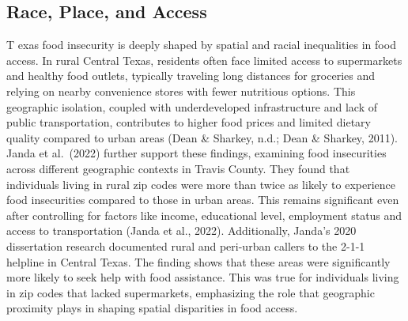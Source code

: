 \documentclass[
]{article}
\begin{document}
\subsection{Race, Place, and Access}\label{race-place-and-access}

T exas food insecurity is deeply shaped by spatial and racial
inequalities in food access. In rural Central Texas, residents often
face limited access to supermarkets and healthy food outlets, typically
traveling long distances for groceries and relying on nearby convenience
stores with fewer nutritious options. This geographic isolation, coupled
with underdeveloped infrastructure and lack of public transportation,
contributes to higher food prices and limited dietary quality compared
to urban areas (Dean \& Sharkey, n.d.; Dean \& Sharkey, 2011). Janda et
al.~(2022) further support these findings, examining food insecurities
across different geographic contexts in Travis County. They found that
individuals living in rural zip codes were more than twice as likely to
experience food insecurities compared to those in urban areas. This
remains significant even after controlling for factors like income,
educational level, employment status and access to transportation (Janda
et al., 2022). Additionally, Janda's 2020 dissertation research
documented rural and peri-urban callers to the 2-1-1 helpline in Central
Texas. The finding shows that these areas were significantly more likely
to seek help with food assistance. This was true for individuals living
in zip codes that lacked supermarkets, emphasizing the role that
geographic proximity plays in shaping spatial disparities in food
access.
\end{document}

